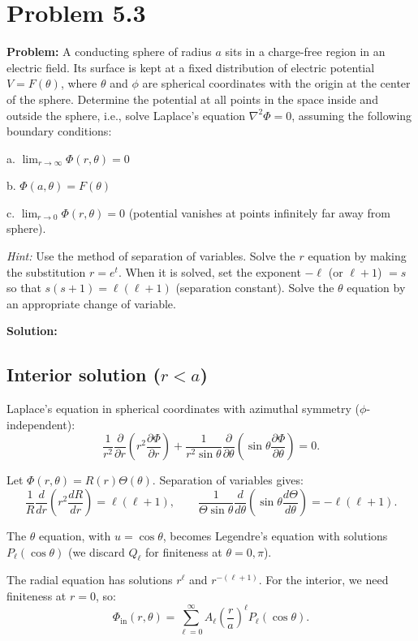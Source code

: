 \documentclass[12pt]{article}
\begin{document}
\section*{Problem 5.3}

\textbf{Problem:} A conducting sphere of radius $a$ sits in a charge-free region in an electric field. Its surface is kept at a fixed distribution of electric potential $V = F(\theta)$, where $\theta$ and $\phi$ are spherical coordinates with the origin at the center of the sphere. Determine the potential at all points in the space inside and outside the sphere, i.e., solve Laplace's equation $\nabla^2\Phi = 0$, assuming the following boundary conditions:

a. $\lim_{r\to\infty} \Phi(r,\theta) = 0$

b. $\Phi(a,\theta) = F(\theta)$

c. $\lim_{r\to 0} \Phi(r,\theta) = 0$ (potential vanishes at points infinitely far away from sphere).

\emph{Hint:} Use the method of separation of variables. Solve the $r$ equation by making the substitution $r = e^t$. When it is solved, set the exponent $-\ell$ (or $\ell+1$) $= s$ so that $s(s+1) = \ell(\ell+1)$ (separation constant). Solve the $\theta$ equation by an appropriate change of variable.

\bigskip
\textbf{Solution:}

\subsection*{Interior solution ($r < a$)}

Laplace's equation in spherical coordinates with azimuthal symmetry ($\phi$-independent):
\[
\frac{1}{r^2}\frac{\partial}{\partial r}\left(r^2\frac{\partial \Phi}{\partial r}\right) + \frac{1}{r^2\sin\theta}\frac{\partial}{\partial \theta}\left(\sin\theta\frac{\partial \Phi}{\partial \theta}\right) = 0.
\]

Let $\Phi(r,\theta) = R(r)\Theta(\theta)$. Separation of variables gives:
\[
\frac{1}{R}\frac{d}{dr}\left(r^2\frac{dR}{dr}\right) = \ell(\ell+1), \qquad \frac{1}{\Theta\sin\theta}\frac{d}{d\theta}\left(\sin\theta\frac{d\Theta}{d\theta}\right) = -\ell(\ell+1).
\]

The $\theta$ equation, with $u = \cos\theta$, becomes Legendre's equation with solutions $P_\ell(\cos\theta)$ (we discard $Q_\ell$ for finiteness at $\theta = 0, \pi$).

The radial equation has solutions $r^\ell$ and $r^{-(\ell+1)}$. For the interior, we need finiteness at $r=0$, so:
\[
\Phi_{\text{in}}(r,\theta) = \sum_{\ell=0}^{\infty} A_\ell \left(\frac{r}{a}\right)^\ell P_\ell(\cos\theta).
\]
\end{document}
